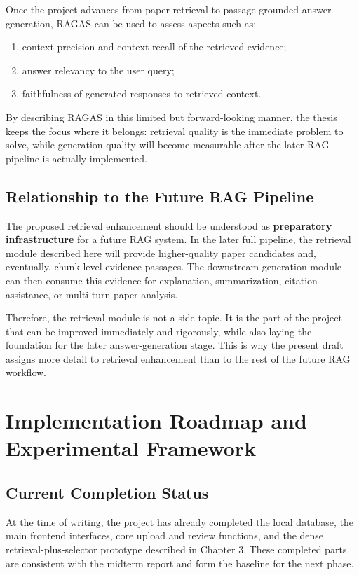 \documentclass[11pt,a4paper,oneside]{report}
\begin{document}
Once the project advances from paper retrieval to passage-grounded answer generation,
RAGAS can be used to assess aspects such as:

\begin{enumerate}
  \item context precision and context recall of the retrieved evidence;
  \item answer relevancy to the user query;
  \item faithfulness of generated responses to retrieved context.
\end{enumerate}

By describing RAGAS in this limited but forward-looking manner, the thesis keeps the
focus where it belongs: retrieval quality is the immediate problem to solve, while
generation quality will become measurable after the later RAG pipeline is actually
implemented.

\section{Relationship to the Future RAG Pipeline}

The proposed retrieval enhancement should be understood as \textbf{preparatory
infrastructure} for a future RAG system. In the later full pipeline, the retrieval
module described here will provide higher-quality paper candidates and, eventually,
chunk-level evidence passages. The downstream generation module can then consume this
evidence for explanation, summarization, citation assistance, or multi-turn paper
analysis.

Therefore, the retrieval module is not a side topic. It is the part of the project
that can be improved immediately and rigorously, while also laying the foundation for
the later answer-generation stage. This is why the present draft assigns more detail
to retrieval enhancement than to the rest of the future RAG workflow.

\chapter{Implementation Roadmap and Experimental Framework}

\section{Current Completion Status}

At the time of writing, the project has already completed the local database, the
main frontend interfaces, core upload and review functions, and the dense
retrieval-plus-selector prototype described in Chapter 3. These completed parts are
consistent with the midterm report and form the baseline for the next phase.
\end{document}
